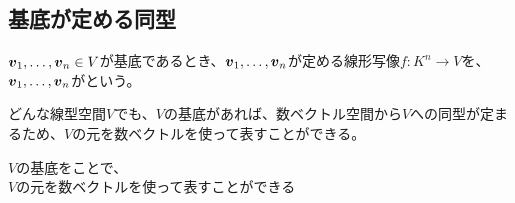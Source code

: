 \documentclass[../../../topic_linear-algebra]{subfiles}
\begin{document}
\subsection{基底が定める同型}

$\vb*{v}_1, \ldots, \vb*{v}_n \in V$が基底であるとき、$\vb*{v}_1, \ldots, \vb*{v}_n$が定める線形写像$f\colon K^n \to V$を、$\vb*{v}_1, \ldots, \vb*{v}_n$がという。

\br

どんな線型空間$V$でも、$V$の基底があれば、数ベクトル空間から$V$への同型が定まるため、$V$の元を数ベクトルを使って表すことができる。

\begin{emphabox}
  \begin{spacebox}
    \begin{center}
      $V$の基底をことで、\\
      $V$の元を数ベクトルを使って表すことができる
    \end{center}
  \end{spacebox}
\end{emphabox}
\end{document}
